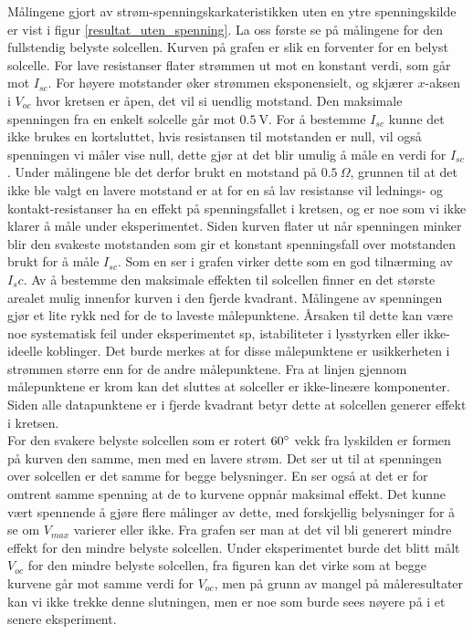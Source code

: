 \documentclass[%
 reprint,
 amsmath,amssymb,
 aps,
 norsk,
 booktabs
]{revtex4-1}
\begin{document}
Målingene gjort av strøm-spenningskarkateristikken uten en ytre spenningskilde er vist i figur \vref{resultat_uten_spenning}. La oss første se på målingene for den fullstendig belyste solcellen. Kurven på grafen er slik en forventer for en belyst solcelle. For lave resistanser flater strømmen ut mot en konstant verdi, som går mot $I_{sc}$. For høyere motstander øker strømmen eksponensielt, og skjærer $x$-aksen i $V_{oc}$ hvor kretsen er åpen, det vil si uendlig motstand. Den maksimale spenningen fra en enkelt solcelle går mot $\SI{0.5}{\volt}$. For å bestemme $I_{sc}$ kunne det ikke brukes en kortsluttet, hvis resistansen til motstanden er null, vil også spenningen vi måler vise null, dette gjør at det blir umulig å måle en verdi for $I_{sc}$. Under målingene ble det derfor brukt en motstand på $\SI{0.5}{\Omega}$, grunnen til at det ikke ble valgt en lavere motstand er at for en så lav resistanse vil lednings- og kontakt-resistanser ha en effekt på spenningsfallet i kretsen, og er noe som vi ikke klarer å måle under eksperimentet. Siden kurven flater ut når spenningen minker blir den svakeste motstanden som gir et konstant spenningsfall over motstanden brukt for å måle $I_{sc}$. Som en ser i grafen virker dette som en god tilnærming av $I_sc$. Av å bestemme den maksimale effekten til solcellen finner en det største arealet mulig innenfor kurven i den fjerde kvadrant. Målingene av spenningen gjør et lite rykk ned for de to laveste målepunktene. Årsaken til dette kan være noe systematisk feil under eksperimentet sp, istabiliteter i lysstyrken eller ikke-ideelle koblinger. Det burde merkes at for disse målepunktene er usikkerheten i strømmen større enn for de andre målepunktene. Fra at linjen gjennom målepunktene er krom kan det sluttes at solceller er ikke-lineære komponenter. Siden alle datapunktene er i fjerde kvadrant betyr dette at solcellen generer effekt i kretsen. \\
For den svakere belyste solcellen som er rotert $60\degree$ vekk fra lyskilden er formen på kurven den samme, men med en lavere strøm. Det ser ut til at spenningen over solcellen er det samme for begge belysninger. En ser også at det er for omtrent samme spenning at de to kurvene oppnår maksimal effekt. Det kunne vært spennende å gjøre flere målinger av dette, med forskjellig belysninger for å se om $V_{max}$ varierer eller ikke. Fra grafen ser man at det vil bli generert mindre effekt for den mindre belyste solcellen. Under eksperimentet burde det blitt målt $V_{oc}$ for den mindre belyste solcellen, fra figuren kan det virke som at begge kurvene går mot samme verdi for $V_{oc}$, men på grunn av mangel på måleresultater kan vi ikke trekke denne slutningen, men er noe som burde sees nøyere på i et senere eksperiment.\par
\end{document}

